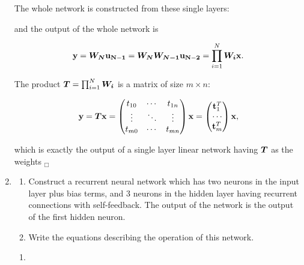 \begin{enumerate}
\begin{solution}
    The whole network is constructed from these single layers:

    \begin{center}
      
    \end{center}
    
    and the output of the whole network is

    \begin{equation}
      \vect{y} = \matr{W_N} \vect{u_{N-1}} = \matr{W_N}  \matr{W_{N-1}}
      \vect{u_{N-2}} = \prod_{i = 1}^{N} \matr{W_i} \vect{x}.
    \end{equation}

    The product $\matr{T} = \prod_{i = 1}^{N} \matr{W_i}$ is a matrix of
    size $m \times n$: 

    \begin{equation}
      \vect{y} = \matr{T} \vect{x} = 
      \begin{pmatrix}
        t_{10} & \cdots & t_{1n} \\ \vdots & \ddots & \vdots \\
        t_{m0} & \cdots & t_{mn} 
      \end{pmatrix} \vect{x} = 
      \begin{pmatrix}  \vect{t}_1^T\\ \cdots \\
        \vect{t}_m^T 
      \end{pmatrix} \vect{x},
    \end{equation}
    
    which is exactly the output of a single layer linear network having
    $\matr{T}$ as the weights $_\Box$

  \end{solution}
  
\item

  \begin{enumerate}
  \item Construct a recurrent neural network which has two neurons in
    the input layer plus bias terms, and 3 neurons in the hidden layer
    having recurrent connections with self-feedback.  The output of
    the network is the output of the first hidden neuron.
  \item Write the equations describing the operation of this network.
  \end{enumerate}

  \begin{solution}
    \begin{enumerate}
    \item \      
      \begin{center}
        \usetikzlibrary{shapes}
        \usetikzlibrary{chains}
        \usetikzlibrary{arrows}
        \begin{tikzpicture}[start chain=hidden going below,
          start chain=input going below]


\end{tikzpicture}
\end{center}
\end{enumerate}
\end{solution}
\end{enumerate}
